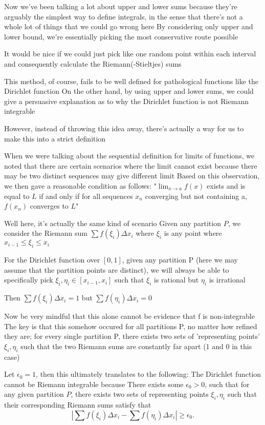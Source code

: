 Now we've been talking a lot about upper and lower sums because they're arguably the simplest way to define integrals, in the sense that there's not a whole lot of things that we could go wrong here
By considering only upper and lower bound, we're essentially picking the most conservative route possible

It would be nice if we could just pick like one random point within each interval and consequently calculate the Riemann(-Stieltjes) sums

This method, of course, fails to be well defined for pathological functions like the Dirichlet function
On the other hand, by using upper and lower sums, we could give a persuasive explanation as to why the Dirichlet function is not Riemann integrable

However, instead of throwing this idea away, there's actually a way for us to make this into a strict definition

When we were talking about the sequential definition for limits of functions, we noted that there are certain scenarios where the limit cannot exist because there may be two distinct sequences may give different limit
Based on this observation, we then gave a reasonable condition as follows:
"$\lim_{x\to a} f(x)$ exists and is equal to $L$ if and only if for all sequences $x_n$ converging but not containing a, $f(x_n)$ converges to $L$"

Well here, it's actually the same kind of scenario
Given any partition $P$, we consider the Riemann sum $\sum f(\xi_i)\Delta x_i$ where $\xi_i$ is any point where $x_{i-1}\le\xi_i\le x_i$

For the Dirichlet function over $[0,1]$, given any partition P (here we may assume that the partition points are distinct), we will always be able to specifically pick $\xi_i,\eta_i\in[x_{i-1},x_i]$ such that $\xi_i$ is rational but $\eta_i$ is irrational

Then $\sum f(\xi_i)\Delta x_i=1$ but $\sum f(\eta_i)\Delta x_i=0$

Now be very mindful that this alone cannot be evidence that f is non-integrable
The key is that this somehow occured for all partitions P, no matter how refined they are; for every single partition P, there exists two sets of 'representing points' $\xi_i,\eta_i$ such that the two Riemann sums are constantly far apart (1 and 0 in this case)

Let $\epsilon_0=1$, then this ultimately translates to the following:
The Dirichlet function cannot be Riemann integrable because
There exists some $\epsilon_0>0$, such that for any given partition $P$, there exists two sets of representing points $\xi_i,\eta_i$ such that their corresponding Riemann sums satisfy that
\[ |\sum f(\xi_i)\Delta x_i - \sum f(\eta_i)\Delta x_i|\ge\epsilon_0. \]

